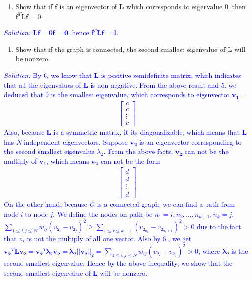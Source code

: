 \documentclass{article}
\def\solColor{blue}
\begin{document}
\begin{enumerate}[resume]

\item Show that if $\boldsymbol{f}$ is an eigenvector of $\boldsymbol{L}$ which corresponds to eigenvalue 0, then $\boldsymbol{f}^T \boldsymbol{L} \boldsymbol{f}=0$.

\end{enumerate}
\textcolor{\solColor}{\textit{Solution:}
$\boldsymbol{L}\boldsymbol{f}=0\boldsymbol{f}=\boldsymbol{0}$, hence $\boldsymbol{f}^T \boldsymbol{L} \boldsymbol{f}=0$.
}

\begin{enumerate}[resume]

\item Show that if the graph is connected, the second smallest eigenvalue 
 of $\boldsymbol{L}$ will be nonzero.

\end{enumerate}

\textcolor{\solColor}{\textit{Solution:}
By 6, we know that $\boldsymbol{L}$ is positive semidefinite matrix, which indicates that all the eigenvalues of $\boldsymbol{L}$ is non-negative. From the above result and 5. we deduced that 0 is the smallest eigenvalue, which corresponds to eigenvector $\boldsymbol{v_1}=$
\begin{align}
    \begin{bmatrix}
       c \\
       c \\
       \vdots \\
       c
     \end{bmatrix}
\end{align}
Also, because $\boldsymbol{L}$ is a symmetric matrix, it its diagonalizable, which means that $\boldsymbol{L}$ has $N$ independent eigenvectors. Suppose $\boldsymbol{v_2}$ is an eigenvector corresponding to the second smallest eigenvalue $\lambda_2$. From the above facts, $\boldsymbol{v_2}$ can not be the multiply of $\boldsymbol{v_1}$, which means $\boldsymbol{v_2}$ can not be the form
\begin{align}
    \begin{bmatrix}
       d \\
       d \\
       \vdots \\
       d
     \end{bmatrix}
\end{align}
On the other hand, because $G$ is a connected graph, we can find a path from node $i$ to node $j$. We define the nodes on path be $n_1=i, n_2,...,n_{k-1},n_k=j$. $\sum\limits_{1 \leq i,j \leq N} w_{ij}(v_2_i-v_2_j)^2 \geq \sum\limits_{1 \leq r \leq k-1} (v_2_{n_r}-v_2_{n_r+1})^2 > 0$ due to the fact that $v_2$ is not the multiply of all one vector. Also by 6., we get $\boldsymbol{v_2}^T\boldsymbol{L}\boldsymbol{v_2}=\boldsymbol{v_2}^T\boldsymbol{\lambda}_2\boldsymbol{v_2}=\boldsymbol{\lambda}_2||\boldsymbol{v_2}||_2=\sum\limits_{1 \leq i,j \leq N} w_{ij}(v_2_i-v_2_j)^2 >0$, where $\boldsymbol{\lambda}_2$ is the second smallest eigenvalue. Hence by the above inequality, we show that the second smallest eigenvalue of $\boldsymbol{L}$ will be nonzero.
}
\end{document}
